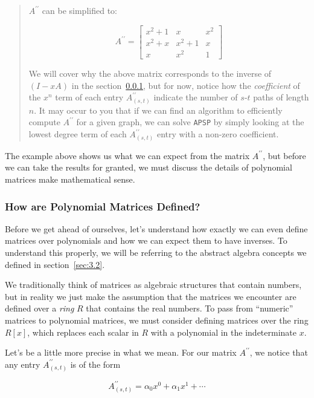 \documentclass[12pt]{article}
\begin{document}
\begin{quote}
    $A^{\prime \prime}$ can be simplified to:

    \[
        A^{\prime \prime} =
        \begin{bmatrix}
            x^2 + 1 & x & x^2 \\
            x^2 + x & x^2 + 1 & x \\
            x & x^2 & 1
        \end{bmatrix}
    \]

    We will cover why the above matrix corresponds to the inverse of $(I - xA)$ in the section~\ref{sec:3.3.4}, but for now, notice how the \emph{coefficient} of the $x^n$ term of each entry $A^{\prime \prime}_{(s, t)}$ indicate the number of $s$-$t$ paths of length $n$. It may occur to you that if we can find an algorithm to efficiently compute $A^{\prime \prime}$ for a given graph, we can solve \texttt{APSP} by simply looking at the lowest degree term of each $A^{\prime \prime}_{(s, t)}$ entry with a non-zero coefficient.
\end{quote}

The example above shows us what we can expect from the matrix $A^{\prime \prime}$, but before we can take the results for granted, we must discuss the details of polynomial matrices make mathematical sense.

\subsubsection{How are Polynomial Matrices Defined?} \label{sec:3.3.4}

Before we get ahead of ourselves, let's understand how exactly we can even define matrices over polynomials and how we can expect them to have inverses. To understand this properly, we will be referring to the abstract algebra concepts we defined in section~\ref{sec:3.2}.

We traditionally think of matrices as algebraic structures that contain numbers, but in reality we just make the assumption that the matrices we encounter are defined over a \emph{ring} $R$ that contains the real numbers. To pass from ``numeric'' matrices to polynomial matrices, we must consider defining matrices over the ring $R[x]$, which replaces each scalar in $R$ with a polynomial in the indeterminate $x$.

Let's be a little more precise in what we mean. For our matrix $A^{\prime \prime}$, we notice that any entry $A^{\prime \prime}_{(s, t)}$ is of the form

\[
    A^{\prime \prime}_{(s, t)} = \alpha_0 x^0 + \alpha_1 x^1 + \cdots
\]
\end{document}
